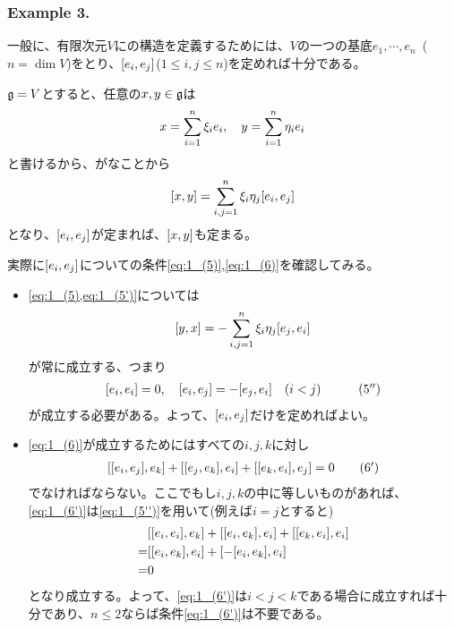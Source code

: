 \documentclass[fleqn,twocolumn,titlepage,dvipdfmx]{jsarticle}
\begin{document}
\subsubsection*{Example 3.}\label{ex:3}
\begin{theorem}
  一般に、有限次元$V$に{}の構造を定義するためには、$V$の一つの基底$e_{1},\cdots,e_{n}$~($n=\dim{V}$)をとり、$\comm{e_{i}}{e_{j}}$($1\le i,j\le n$)を定めれば十分である。
\end{theorem}
\begin{Proof}
  \href{Def:1_3}{$\mathfrak{g}=V$}とすると、任意の$x,y\in\mathfrak{g}$は
  \begin{align*}
    x=\sum_{i=1}^{n}\xi_{i}e_{i}\qc y=\sum_{i=1}^{n}\eta_{i}e_{i}
  \end{align*}
  と書けるから、がなことから
  \begin{align*}
    \comm{x}{y}=\sum_{i,j=1}^{n}\xi_{i}\eta_{j}\comm{e_{i}}{e_{j}}
  \end{align*}
  となり、$\comm{e_{i}}{e_{j}}$が定まれば、$\comm{x}{y}$も定まる。
\end{Proof}
\begin{remark}
  実際に$\comm{e_{i}}{e_{j}}$について{}の条件\eqref{eq:1_(5)},\eqref{eq:1_(6)}を確認してみる。
  \begin{itemize}
    \item \cref{eq:1_(5),eq:1_(5')}については
      \begin{align*}
        \comm{y}{x}=-\sum_{i,j=1}^{n}\xi_{i}\eta_{j}\comm{e_{j}}{e_{i}}
      \end{align*}
      が常に成立する、つまり
      \begin{align*}
        \comm{e_{i}}{e_{i}}=0\qc \comm{e_{i}}{e_{j}}=-\comm{e_{j}}{e_{i}} \qq{$(i<j)$} \tag{5$^{\dprime}$}\label{eq:1_(5'')}
      \end{align*}
      が成立する必要がある。よって、$\comm{e_{i}}{e_{j}}$だけを定めればよい。
    \item \cref{eq:1_(6)}が成立するためにはすべての$i,j,k$に対し
      \begin{align*}
        \comm{\comm{e_{i}}{e_{j}}}{e_{k}}
        +\comm{\comm{e_{j}}{e_{k}}}{e_{i}}
        +\comm{\comm{e_{k}}{e_{i}}}{e_{j}}
        =0 \tag{6$^\prime$}\label{eq:1_(6')}
      \end{align*}
      でなければならない。ここでもし$i,j,k$の中に等しいものがあれば、\eqref{eq:1_(6')}は\eqref{eq:1_(5'')}を用いて(例えば$i=j$とすると)
      \begin{align*}
        &\comm{\comm{e_{i}}{e_{i}}}{e_{k}}
        +\comm{\comm{e_{i}}{e_{k}}}{e_{i}}
        +\comm{\comm{e_{k}}{e_{i}}}{e_{i}}\\
        =&\comm{\comm{e_{i}}{e_{k}}}{e_{i}}
        +\comm{-\comm{e_{i}}{e_{k}}}{e_{i}}\\
        =&0
      \end{align*}
      となり成立する。よって、\eqref{eq:1_(6')}は$i<j<k$である場合に成立すれば十分であり、$n\le2$ならば条件\eqref{eq:1_(6')}は不要である。
  \end{itemize}
\end{remark}
\end{document}
